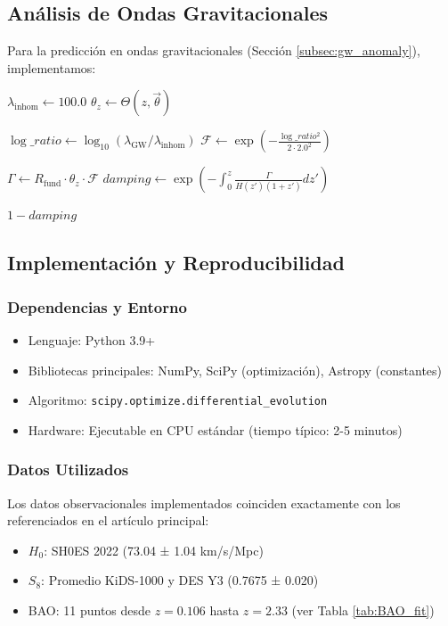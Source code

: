 \documentclass[12pt, a4paper]{article}
\theoremstyle{plain}
\theoremstyle{definition}
\begin{document}
\subsection{Análisis de Ondas Gravitacionales}

Para la predicción en ondas gravitacionales (Sección \ref{subsec:gw_anomaly}), implementamos:

\begin{algorithmic}[1]
    \STATE $\lambda_{\text{inhom}} \gets 100.0$ 
    \STATE $\theta_z \gets \Theta(z, \vec{\theta})$
    
    \STATE {}
    \STATE $\log\_ratio \gets \log_{10}(\lambda_{\text{GW}} / \lambda_{\text{inhom}})$
    \STATE $\mathcal{F} \gets \exp\left(-\frac{\log\_ratio^2}{2 \cdot 2.0^2}\right)$ 
    
    \STATE $\Gamma \gets R_{\text{fund}} \cdot \theta_z \cdot \mathcal{F}$
    \STATE $damping \gets \exp\left(-\int_0^z \frac{\Gamma}{H(z')(1+z')} dz'\right)$
    
    \RETURN $1 - damping$ 
\ENDFUNCTION
\end{algorithmic}

\subsection{Implementación y Reproducibilidad}

\subsubsection{Dependencias y Entorno}
\begin{itemize}
    \item Lenguaje: Python 3.9+
    \item Bibliotecas principales: NumPy, SciPy (optimización), Astropy (constantes)
    \item Algoritmo: \texttt{scipy.optimize.differential\_evolution}
    \item Hardware: Ejecutable en CPU estándar (tiempo típico: 2-5 minutos)
\end{itemize}

\subsubsection{Datos Utilizados}
Los datos observacionales implementados coinciden exactamente con los referenciados en el artículo principal:
\begin{itemize}
    \item $H_0$: SH0ES 2022 (73.04 ± 1.04 km/s/Mpc)
    \item $S_8$: Promedio KiDS-1000 y DES Y3 (0.7675 ± 0.020)
    \item BAO: 11 puntos desde $z=0.106$ hasta $z=2.33$ (ver Tabla \ref{tab:BAO_fit})
\end{itemize}
\end{document}
